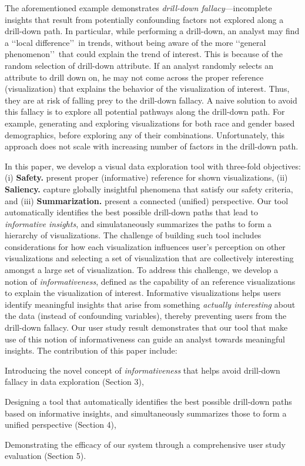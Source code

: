 The aforementioned example demonstrates \emph{drill-down fallacy}---incomplete insights that result from potentially confounding factors not explored along a drill-down path. In particular, while performing a drill-down, an analyst may find a \lq\lq local difference\rq\rq\ in trends, without being aware of the more \lq\lq general phenomenon\rq\rq\ that could explain the trend of interest. This is because of the random selection of drill-down attribute. If an analyst randomly selects an attribute to drill down on, he may not come across the proper reference (visualization) that explains the behavior of the visualization of interest. Thus, they are at risk of falling prey to the drill-down fallacy. A naive solution to avoid this fallacy is to explore all potential pathways along the drill-down path. For example, generating and exploring visualizations for both race and gender based demographics, before exploring any of their combinations. Unfortunately, this approach does not scale with increasing number of factors in the drill-down path.

In this paper, we develop a visual data exploration tool with three-fold objectives: (i) \textbf{Safety.} present proper (informative) reference for shown visualizations, (ii) \textbf{Saliency.} capture globally insightful phenomena that satisfy our safety criteria, and (iii) \textbf{Summarization.} present a connected (unified) perspective. Our tool automatically identifies the best possible drill-down paths that lead to \emph{informative insights}, and simulataneously summarizes the paths to form a hierarchy of visualizations. The challenge of building such tool includes considerations for how each visualization influences user's perception on other visualizations and selecting a set of visualization that are collectively interesting amongst a large set of visualization. To address this challenge, we develop a notion of \emph{informativeness}, defined as the capability of an reference visualizations to explain the visualization of interest. Informative visualizations helps users identify meaningful insights that arise from something \textit{actually interesting} about the data (instead of confounding variables), thereby preventing users from the drill-down fallacy. Our user study result demonstrates that our tool that make use of this notion of informativeness can guide an analyst towards meaningful insights. The contribution of this paper include:
\begin{denselist}
\item Introducing the novel concept of \emph{informativeness} that helps avoid drill-down fallacy in data exploration (Section 3),
\item Designing a tool that automatically identifies the best possible drill-down paths based on informative insights, and simultaneously summarizes those to form a unified perspective (Section 4),
\item Demonstrating the efficacy of our system through a comprehensive user study evaluation (Section 5).
\end{denselist}

